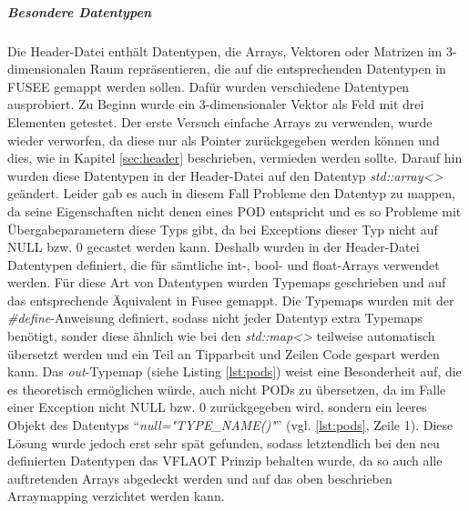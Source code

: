 \begin{code}[caption={inoreregex},label={lst:ignore}, escapechar=|]
\end{code}

\subparagraph{Besondere Datentypen} \label{besonderedatentypen}
Die Header-Datei enthält Datentypen, die Arrays, Vektoren oder Matrizen im 3-dimensionalen Raum repräsentieren, die auf die entsprechenden Datentypen in FUSEE gemappt werden sollen. Dafür wurden verschiedene Datentypen ausprobiert. Zu Beginn wurde ein 3-dimensionaler Vektor als Feld mit drei Elementen getestet. 
Der erste Versuch einfache Arrays zu verwenden, wurde wieder verworfen, da diese nur als Pointer zurückgegeben werden können und dies, wie in Kapitel \ref{sec:header} beschrieben, vermieden werden sollte. Darauf hin wurden diese Datentypen in der Header-Datei auf den Datentyp \emph{std::array<>} geändert. Leider gab es auch in diesem Fall Probleme den Datentyp zu mappen, da seine Eigenschaften nicht denen eines POD entspricht und es so Probleme mit Übergabeparametern diese Typs gibt, da bei Exceptions dieser Typ nicht auf NULL bzw. 0 gecastet werden kann.
Deshalb wurden in der Header-Datei Datentypen definiert, die für sämtliche int-, bool- und float-Arrays verwendet werden. Für diese Art von Datentypen wurden Typemaps geschrieben und auf das entsprechende Äquivalent in Fusee gemappt. Die Typemaps wurden mit der \emph{\#define}-Anweisung definiert, sodass nicht jeder Datentyp extra Typemaps benötigt, sonder diese ähnlich wie bei den \emph{std::map<>} teilweise automatisch übersetzt werden und ein Teil an Tipparbeit und Zeilen Code gespart werden kann.
Das \emph{out}-Typemap (siehe Listing \ref{lst:pods}) weist eine Besonderheit auf, die es theoretisch ermöglichen würde, auch nicht PODs zu übersetzen, da im Falle einer Exception nicht NULL bzw. 0 zurückgegeben wird, sondern ein leeres Objekt des Datentyps \enquote{\emph{null="TYPE\_NAME()"}} (vgl. \ref{lst:pods}, Zeile 1). Diese Lösung wurde jedoch erst sehr spät gefunden, sodass letztendlich bei den neu definierten Datentypen das VFLAOT Prinzip behalten wurde, da so auch alle auftretenden Arrays abgedeckt werden und auf das oben beschrieben Arraymapping verzichtet werden kann. 

